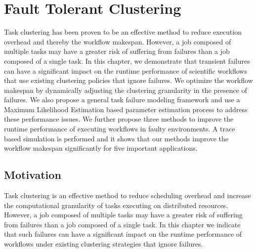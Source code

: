 \chapter{Fault Tolerant Clustering}

Task clustering has been proven to be an effective method to reduce execution overhead and thereby the workflow makespan. However, a job composed of multiple tasks may have a greater risk of suffering from failures than a job composed of a single task. In this chapter, we demonstrate that transient failures can have a significant impact on the runtime performance of scientific workflows that use existing clustering policies that ignore failures. We optimize the workflow makespan by dynamically adjusting the clustering granularity in the presence of failures. We also propose a general task failure modeling framework and use a Maximum Likelihood Estimation based parameter estimation process to address these performance issues. We further propose three methods to improve the runtime performance of executing workflows in faulty environments. A trace based simulation is performed and it shows that our methods improve the workflow makespan significantly for five important applications.    

\section{Motivation}

Task clustering is an effective method to reduce scheduling overhead and increase the computational granularity of tasks executing on distributed resources. However, a job composed of multiple tasks may have a greater risk of suffering from failures than a job composed of a single task. In this chapter we indicate that such failures can have a significant impact on the runtime performance of workflows under existing clustering strategies that ignore failures. 

